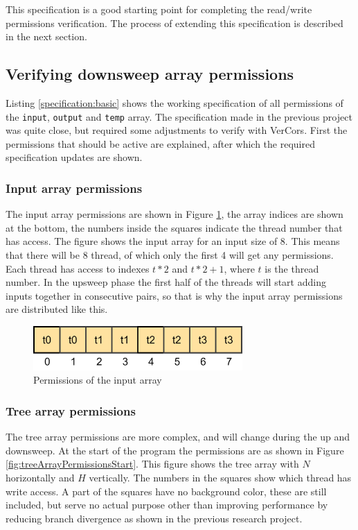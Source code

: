 \documentclass[a4paper]{article}
\newcommand{\code}[1]{\texttt{\small \color{inline}#1}} %
\begin{document}
This specification is a good starting point for completing the read/write permissions verification. The process of extending this specification is described in the next section.



\subsection{Verifying downsweep array permissions}
Listing \ref{specification:basic} shows the working specification of all permissions of the \code{input}, \code{output} and \code{temp} array. The specification made in the previous project was quite close, but required some adjustments to verify with VerCors. First the permissions that should be active are explained, after which the required specification updates are shown.

\subsubsection{Input array permissions}
The input array permissions are shown in Figure \ref{fig:inputArrayPermissions}, the array indices are shown at the bottom, the numbers inside the squares indicate the thread number that has access. The figure shows the input array for an input size of 8. This means that there will be 8 thread, of which only the first 4 will get any permissions. Each thread has access to indexes $t*2$ and $t*2+1$, where $t$ is the thread number. In the upsweep phase the first half of the threads will start adding inputs together in consecutive pairs, so that is why the input array permissions are distributed like this.

\begin{figure}[htb!]
	\centering
	\includegraphics[width=80mm]{../images/input-permissions-v1.png}
	\caption{Permissions of the input array}
	\label{fig:inputArrayPermissions}
\end{figure}
\FloatBarrier

\subsubsection{Tree array permissions}
The tree array permissions are more complex, and will change during the up and downsweep. At the start of the program the permissions are as shown in Figure \ref{fig:treeArrayPermissionsStart}. This figure shows the tree array with $N$ horizontally and $H$ vertically. The numbers in the squares show which thread has write access. A part of the squares have no background color, these are still included, but serve no actual purpose other than improving performance by reducing branch divergence as shown in the previous research project.
\end{document}
